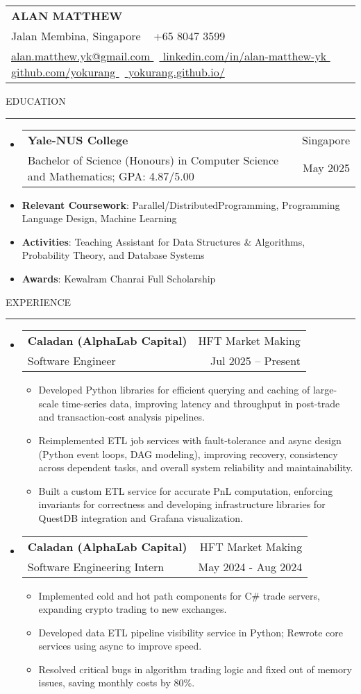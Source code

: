 \documentclass[letterpaper, 11pt]{article}
\makeatletter
\def\sectionlineskip{\medskip}
\def\sectionskip{\medskip}
\def\namesize{\LARGE}
\newcommand{\ResumeHeader}[6]{
  \noindent
  \begin{tabularx}{\textwidth}{>{\centering\arraybackslash}X}
    \namesize\MakeUppercase{\textbf{\fullname}} \\
    #1 \textbar\ #2 \\
    #3 \textbar\ #4 \textbar\ #5 \textbar\ #6 \\
  \end{tabularx}
}
\def \fullname { Alan Matthew }
\def \linkedinlink { https://www.linkedin.com/in/alan-matthew-yk }
\def \linkedintext { linkedin.com/in/alan-matthew-yk }
\def \phonenumber { +65 8047 3599 }
\def \githublink { https://github.com/yokurang }
\def \githubtext { github.com/yokurang }
\def \emaillink { mailto:alan.matthew.yk@gmail.com }
\def \emailtext { alan.matthew.yk@gmail.com }
\def \websitelink { https://yokurang.github.io/ }
\def \websitetext { yokurang.github.io/ }
\def \address { 9 Jalan Membina, Singapore }
\def \headertype {\ResumeHeader}
\def \linkedin {\href{\linkedinlink}{\linkedintext}}
\def \phone {{\phonenumber}}
\def \email {\href{\emaillink}{\emailtext}}
\def \github {\href{\githublink}{\githubtext}}
\def \website {\href{\websitelink}{\websitetext}}
\newcommand{\SectionHeading}[1]{
  \sectionskip
  \raggedright\raggedbottom\MakeUppercase{\large{#1}}
  \sectionlineskip
  \hrule
  \color{black}
}
\newcommand{\ResumeEntryTSDL}[4]{
  \vspace{1pt}\item
    \begin{tabular*}{\textwidth}[t]{l@{\extracolsep{\fill}}r} 
      \textbf{#1} & #2 \\
      #3 & #4 \\
    \end{tabular*}\vspace{-2.835pt} %
}
\newcommand{\ResumeItem}[2]{
  \item{
    \textbf{#1}{: #2 \vspace{-2.835pt}}
  }
}
\newcommand{\ResumeItemDefault}[1]{
  \item{
    #1 \vspace{-2.835pt}
  }
}
\newcommand{\ResumeSubItem}[2]{\ResumeItem{#1}{#2}\vspace{-2.835pt}}
\newcommand{\ResumeEntryStart}{\begin{itemize}[leftmargin=0mm, label={}]}
\newcommand{\ResumeEntryEnd}{\end{itemize}\vspace{-2.835pt}} %
\newcommand{\ResumeItemListStart}{\begin{itemize}[leftmargin=5mm, label=$\bullet$, itemsep=1mm, parsep=1mm]} %
\newcommand{\ResumeItemListEnd}{\end{itemize}}
\makeatother
\begin{document}
  \headertype{\address}{\phone}{\email}{\linkedin}{\github}{\website}
  
  \SectionHeading{Education}
  \ResumeEntryStart
    \ResumeEntryTSDL{Yale-NUS College} {Singapore}
    {Bachelor of Science (Honours) in Computer Science and Mathematics; GPA: 4.87/5.00} {May 2025}
    \ResumeSubItem{Relevant Coursework}{Parallel/DistributedProgramming, Programming Language Design, Machine Learning}
    \ResumeSubItem{Activities}{Teaching Assistant for Data Structures \& Algorithms, Probability Theory, and Database Systems}
    \ResumeSubItem{Awards}{Kewalram Chanrai Full Scholarship}
  \ResumeEntryEnd

  \vspace{5pt}

  \SectionHeading{Experience}

  \ResumeEntryStart
  \ResumeEntryTSDL{Caladan (AlphaLab Capital)}{HFT Market Making}{Software Engineer}{Jul 2025 – Present}
  \ResumeItemListStart
  \ResumeItemDefault{Developed Python libraries for efficient querying and caching of large-scale time-series data, improving latency and throughput in post-trade and transaction-cost analysis pipelines.}
  \ResumeItemDefault{Reimplemented ETL job services with fault-tolerance and async design (Python event loops, DAG modeling), improving recovery, consistency across dependent tasks, and overall system reliability and maintainability.}
  \ResumeItemDefault{Built a custom ETL service for accurate PnL computation, enforcing invariants for correctness and developing infrastructure libraries for QuestDB integration and Grafana visualization.}  
  \ResumeItemListEnd
  \ResumeEntryEnd


  \ResumeEntryStart
  \ResumeEntryTSDL{Caladan (AlphaLab Capital)}{HFT Market Making}{Software Engineering Intern}{May 2024 - Aug 2024}
  \ResumeItemListStart
  \ResumeItemDefault{Implemented cold and hot path components for C\# trade servers, expanding crypto trading to new exchanges.}
  \ResumeItemDefault{Developed data ETL pipeline visibility service in Python; Rewrote core services using async to improve speed.}
  \ResumeItemDefault{Resolved critical bugs in algorithm trading logic and fixed out of memory issues, saving monthly costs by 80\%.}
  \ResumeItemListEnd
  \ResumeEntryEnd
\end{document}
